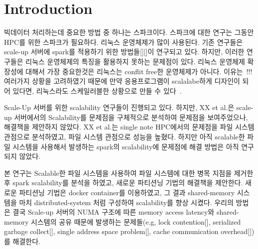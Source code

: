 \section{Introduction} \label{sec:introduction}
\ifkor
빅데이터 처리하는데 중요한 방법 중 하나는 스파크이다.
스파크에 대한 연구는 그동안 
HPC를 위한 스파크가 필요하다. 
리눅스 운영체제가 많이 사용된다. 
기존 연구들은 scale-up 서버에 spark를 적용하기 위한 방법들[][]이 연구되고 있다.
하지만, 이러한 연구들은 리눅스 운영체제의 특징을 활용하지 못하는 문제점이 있다.
리눅스 운영체제 확장성에 대해서 가장 중요한것은 
리눅스는 conflit free한 운영체제가 아니다.
이유는~!!! 여러가지 상황을 고려하였기 때문에 
만약 응용프로그램이 scalalabe하게 디자인이 되어 있다면, 리눅스라도 스케일러블한 
상황으로 만들 수 있다~\cite{SilasBoydWickizer2010LinuxScales48}. 
\else

\fi

\ifkor
Scale-Up 서버를 위한 scalability 연구들이 진행되고 있다.
하지만, XX et al.은 scale-up 서버에서의 Scalability를 문제점을 구체적으로
분석하여 문제점을 보여주었으나, 해결책을 제안하지 않았다. 
XX et al.는 single note HPC에서의 문제점을 파일 시스템 관점으로 분석하였고, 
파일 시스템 관점으로 성능을 높혔다. 
하지만 아직 scalable한 파일 시스템을 사용해서 발생하는 spark의 scalability에 
문제점에 해결 방법은 아직 연구되지 않았다.
\else


\fi


\ifkor
본 연구는 Scalable한 파일 시스템을 사용하여 파일 시스템에 대한 병목 지점을 
제거한 후 spark scalability를 분석을 하였고, 새로운 파티션닝 기법의 해결책을 제안한다. 
새로운 파티션닝 기법은 docker container를 이용하였고, 그 결과 shared-memory 시스템을 마치
distributed-system 처럼 구성하여 scalability를 향상 시켰다.
우리의 방법은 결국 Scale-up 서버의 NUMA 구조에 따른 memory access latency와 
shared-memory 시스템의 공유 때문에 발생하는 문제들(e.g, lock contention[], 
serialized garbage collect[],
single address space problem[], 
cache communication overhead[])를 해결한다.
\else


